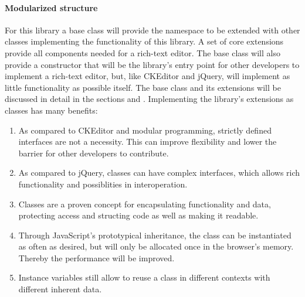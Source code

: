 


\paragraph{Modularized structure} For this library a base class will provide the namespace to be extended with other classes implementing the functionality of this library. A set of core extensions provide all components needed for a rich-text editor. The base class will also provide a constructor that will be the library's entry point for other developers to implement a rich-text editor, but, like CKEditor and jQuery, will implement as little functionality as possible itself. The base class and its extensions will be discussed in detail in the sections  and . Implementing the library's extensions as classes has many benefits:

\begin{enumerate}
\item As compared to CKEditor and modular programming, strictly defined interfaces are not a necessity. This can improve flexibility and lower the barrier for other developers to contribute. %
\item As compared to jQuery, classes can have complex interfaces, which allows rich functionality and possiblities in interoperation.
\item Classes are a proven concept for encapsulating functionality and data, protecting access and structing code as well as making it readable.
\item Through JavaScript's prototypical inheritance, the class can be instantiated as often as desired, but will only be allocated once in the browser's memory. Thereby the performance will be improved.
\item Instance variables still allow to reuse a class in different contexts with different inherent data. %
\end{enumerate}

